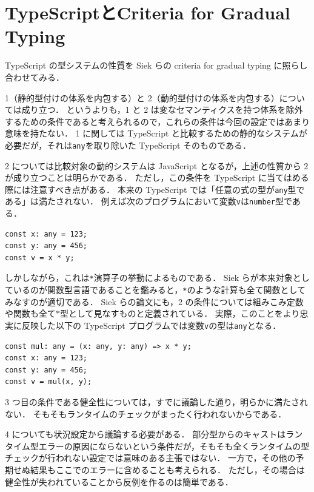 \section{TypeScriptとCriteria for Gradual Typing}

TypeScript の型システムの性質を Siek らの criteria for gradual typing に照らし合わせてみる．

1（静的型付けの体系を内包する）と 2（動的型付けの体系を内包する）については成り立つ．
というよりも，1 と 2 は変なセマンティクスを持つ体系を除外するための条件であると考えられるので，これらの条件は今回の設定ではあまり意味を持たない．
1 に関しては TypeScript と比較するための静的なシステムが必要だが，それは\texttt{any}を取り除いた TypeScript そのものである．

2 については比較対象の動的システムは JavaScript となるが，上述の性質から 2 が成り立つことは明らかである．
ただし，この条件を TypeScript に当てはめる際には注意すべき点がある．
本来の TypeScript では「任意の式の型が\texttt{any}型である」は満たされない．
例えば次のプログラムにおいて変数\texttt{v}は\texttt{number}型である．

\begin{lstlisting}
const x: any = 123;
const y: any = 456;
const v = x * y;
\end{lstlisting}

しかしながら，これは\texttt{*}演算子の挙動によるものである．
Siek らが本来対象としているのが関数型言語であることを鑑みると，\texttt{*}のような計算も全て関数としてみなすのが適切である．
Siek らの論文にも，2 の条件については組みこみ定数や関数も全て$*$型として見なすものと定義されている．
実際，このことをより忠実に反映した以下の TypeScript プログラムでは変数\texttt{v}の型は\texttt{any}となる．

\begin{lstlisting}
const mul: any = (x: any, y: any) => x * y;
const x: any = 123;
const y: any = 456;
const v = mul(x, y);
\end{lstlisting}

3 つ目の条件である健全性については，すでに議論した通り，明らかに満たされない．
そもそもランタイムのチェックがまったく行われないからである．

4 についても状況設定から議論する必要がある．
部分型からのキャストはランタイム型エラーの原因にならないという条件だが，そもそも全くランタイムの型チェックが行われない設定では意味のある主張ではない．
一方で，その他の予期せぬ結果もここでのエラーに含めることも考えられる．
ただし，その場合は健全性が失われていることから反例を作るのは簡単である．

